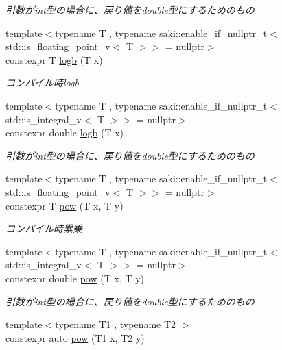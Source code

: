 \begin{DoxyCompactItemize}
\begin{DoxyCompactList}\small\item\em 引数がint型の場合に、戻り値をdouble型にするためのもの \end{DoxyCompactList}\item 
{\footnotesize template$<$typename T , typename saki\+::enable\+\_\+if\+\_\+nullptr\+\_\+t$<$ std\+::is\+\_\+floating\+\_\+point\+\_\+v$<$ T $>$$>$  = nullptr$>$ }\\constexpr T \mbox{\hyperlink{namespacesaki_ab7e81af48b13fbf88f135d296471bac1}{logb}} (T x)
\begin{DoxyCompactList}\small\item\em コンパイル時logb \end{DoxyCompactList}\item 
{\footnotesize template$<$typename T , typename saki\+::enable\+\_\+if\+\_\+nullptr\+\_\+t$<$ std\+::is\+\_\+integral\+\_\+v$<$ T $>$$>$  = nullptr$>$ }\\constexpr double \mbox{\hyperlink{namespacesaki_adf4ba562bb9897e98b75eb95027bfad5}{logb}} (T x)
\begin{DoxyCompactList}\small\item\em 引数がint型の場合に、戻り値をdouble型にするためのもの \end{DoxyCompactList}\item 
{\footnotesize template$<$typename T , typename saki\+::enable\+\_\+if\+\_\+nullptr\+\_\+t$<$ std\+::is\+\_\+floating\+\_\+point\+\_\+v$<$ T $>$$>$  = nullptr$>$ }\\constexpr T \mbox{\hyperlink{namespacesaki_aa5b66f18d7c8c94b4c50731449ed3240}{pow}} (T x, T y)
\begin{DoxyCompactList}\small\item\em コンパイル時累乗 \end{DoxyCompactList}\item 
{\footnotesize template$<$typename T , typename saki\+::enable\+\_\+if\+\_\+nullptr\+\_\+t$<$ std\+::is\+\_\+integral\+\_\+v$<$ T $>$$>$  = nullptr$>$ }\\constexpr double \mbox{\hyperlink{namespacesaki_a53b0e93733e85d7c6ab17aea25072536}{pow}} (T x, T y)
\begin{DoxyCompactList}\small\item\em 引数がint型の場合に、戻り値をdouble型にするためのもの \end{DoxyCompactList}\item 
{\footnotesize template$<$typename T1 , typename T2 $>$ }\\constexpr auto \mbox{\hyperlink{namespacesaki_aede1168d9c20adf475c0a27670925c34}{pow}} (T1 x, T2 y)

\end{DoxyCompactItemize}
